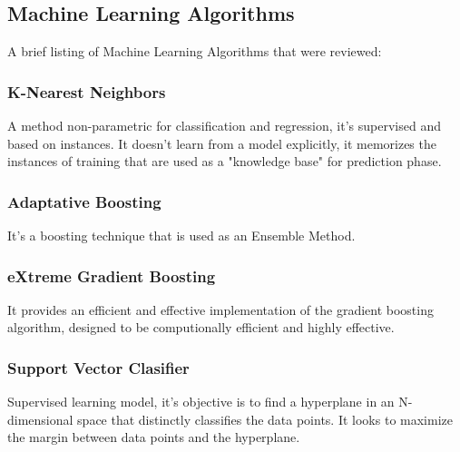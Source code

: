 \documentclass[conference]{IEEEtran}
\begin{document}
\subsection{Machine Learning Algorithms}
A brief listing of Machine Learning Algorithms that were reviewed:
\subsubsection{K-Nearest Neighbors}
A method non-parametric for classification and regression, it's supervised and based on instances. It doesn't learn from a model explicitly, it memorizes
the instances of training that are used as a "knowledge base" for prediction phase.
\subsubsection{Adaptative Boosting}
It's a boosting technique that is used as an Ensemble Method.
\subsubsection{eXtreme Gradient Boosting}
It provides an efficient and effective implementation of the gradient boosting algorithm, designed to be computionally efficient
and highly effective.
\subsubsection{Support Vector Clasifier}
Supervised learning model, it's objective is to find a hyperplane in an N-dimensional space that
distinctly classifies the data points. It looks to maximize the margin between data points and the hyperplane.
\end{document}
